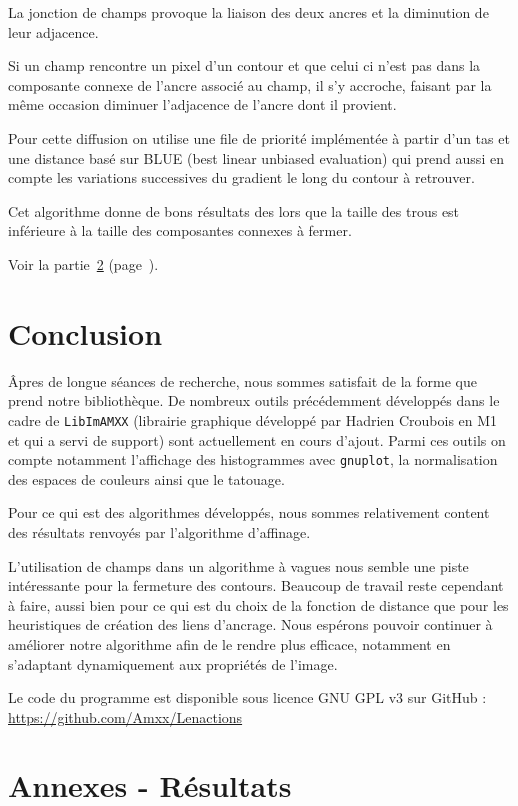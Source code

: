 La jonction de champs provoque la liaison des deux ancres et la diminution de leur adjacence.

Si un champ rencontre un pixel d'un contour et que celui ci n'est pas dans la composante connexe de l'ancre associé au champ, il s'y accroche, faisant par la même occasion diminuer l'adjacence de l'ancre dont il provient.

Pour cette diffusion on utilise une file de priorité implémentée à partir d'un tas et une distance basé sur \textsc{BLUE} (best linear unbiased evaluation) qui prend aussi en compte les variations successives du gradient le long du contour à retrouver.

Cet algorithme donne de bons résultats des lors que la taille des trous est inférieure à la taille des composantes connexes à fermer. 

Voir la partie~\ref{resultats} (page~\pageref{resultats}).

\section{Conclusion}

Âpres de longue séances de recherche, nous sommes satisfait de la forme que prend notre bibliothèque. De nombreux outils précédemment développés dans le cadre de \texttt{LibImAMXX} (librairie graphique développé par Hadrien Croubois en M1 et qui a servi de support) sont actuellement en cours d'ajout. Parmi ces outils on compte notamment l'affichage des histogrammes avec \texttt{gnuplot}, la normalisation des espaces de couleurs ainsi que le tatouage.

Pour ce qui est des algorithmes développés, nous sommes relativement content des résultats renvoyés par l'algorithme d'affinage.

L'utilisation de champs dans un algorithme à vagues nous semble une piste intéressante pour la fermeture des contours. Beaucoup de travail reste cependant à faire, aussi bien pour ce qui est du choix de la fonction de distance que pour les heuristiques de création des liens d'ancrage.
Nous espérons pouvoir continuer à améliorer notre algorithme afin de le rendre plus efficace, notamment en s'adaptant dynamiquement aux propriétés de l'image.

Le code du programme est disponible sous licence GNU GPL v3 sur GitHub : \url{https://github.com/Amxx/Lenactions}

\appendix
\newpage
\section{Annexes - Résultats} \label{resultats}


